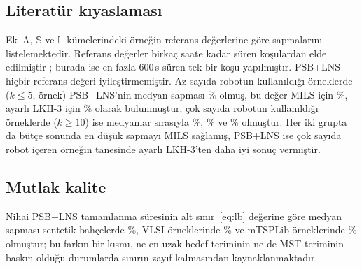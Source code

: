 \subsection{Literatür kıyaslaması}
Ek~A, $\mathbb{S}$ ve $\mathbb{L}$ kümelerindeki
\LitCount{} örneğin referans değerlerine göre sapmalarını listelemektedir. Referans değerler
birkaç saate kadar süren koşulardan elde edilmiştir \citep{hehaoxia2024}; burada ise en
fazla 600\,s süren tek bir koşu yapılmıştır. PSB+LNS hiçbir referans değeri iyileştirmemiştir.
Az sayıda robotun kullanıldığı örneklerde ($k\le 5$, \LitFewKCount{} örnek) PSB+LNS'nin medyan sapması
\LitFewKPsbFinal\% olmuş, bu değer MILS için \LitFewKMilsFinal\%, ayarlı LKH-3 için
\LitFewKTunedFinal\% olarak bulunmuştur; çok sayıda robotun kullanıldığı örneklerde ($k\ge 10$) ise medyanlar sırasıyla
\LitManyKPsbFinal\%, \LitManyKMilsFinal\% ve \LitManyKTunedFinal\% olmuştur. Her iki grupta
da bütçe sonunda en düşük sapmayı MILS sağlamış, PSB+LNS ise çok sayıda robot içeren
\LitManyKCount{} örneğin \LitManyKPsbBeatsTuned{} tanesinde ayarlı LKH-3'ten daha iyi
sonuç vermiştir.

\subsection{Mutlak kalite}
Nihai PSB+LNS tamamlanma süresinin alt sınır~\eqref{eq:lb} değerine göre medyan sapması
sentetik bahçelerde \LbGapOrch\%, VLSI örneklerinde \LbGapVlsi\% ve mTSPLib örneklerinde
\LbGapMtsp\% olmuştur; bu farkın bir kısmı, ne en uzak hedef teriminin ne de MST teriminin baskın
olduğu durumlarda sınırın zayıf kalmasından kaynaklanmaktadır.
